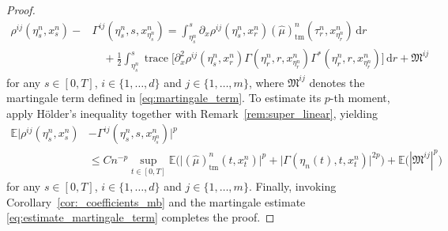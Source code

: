 \documentclass[reqno,  oneside, 12pt]{amsart}
\DeclareMathOperator{\tr}{trace}
\newcommand{\E}{\mathbb E}
\begin{document}
\begin{proof}
	\begin{align*}
		\rho^{ij}(\eta^n_s, x_s^n) - &\Gamma^{ij}(\eta^n_s, s, x_{\eta^n_s}^n)
		= \int_{\eta^n_s}^s \partial_x \rho^{ij}(\eta^n_s, x_r^n)(\widehat \mu)_{\mathrm{tm}}^{n}(\tau^n_r, x_{\eta^n_r}^n) \,  \mathrm{d}r \\
		&\quad + \frac{1}{2} \int_{\eta^n_s}^{s} \tr\Big[\partial_x^2 \rho^{ij}(\eta^n_s, x_r^n) 
		\Gamma(\eta^n_r, r, x_{\eta^n_r}^n)\Gamma^*(\eta^n_r, r, x_{\eta^n_r}^n)\Big] \,  \mathrm{d}r  + \mathfrak{M}^{ij}
	\end{align*}
	for any \( s \in [0,T] \), $i\in\{1,\ldots,d\}$ and $j\in\{1,\ldots,m\}$, where \( \mathfrak{M}^{ij} \) denotes the martingale term defined in \eqref{eq:martingale_term}. 
	To estimate its \( p \)-th moment,  apply H\"older's inequality together with Remark~\ref{rem:super_linear}, yielding
	\begin{align*}
		\E \big|\rho^{ij}(\eta^n_s, x_s^n) &-\Gamma^{ij}(\eta^n_s, s, x_{\eta^n_s}^n) \big|^p \\
		&\leq C n^{-p} \sup_{t \in [0, T]}  \E\big( 
		\big|(\widehat \mu)_{\mathrm{tm}}^{n}(t, x_t^n)\big|^p + 
		\big|\Gamma(\eta_n(t), t, x_t^n)\big|^{2p}
		\big) + \E\big(|\mathfrak{M}^{ij}|^p\big)
	\end{align*}
	for any \( s \in [0,T] \), $i\in\{1,\ldots,d\}$ and $j\in\{1,\ldots,m\}$.
	Finally, invoking Corollary~\ref{cor:_coefficients_mb} and the martingale estimate \eqref{eq:estimate_martingale_term} completes the proof.
\end{proof}
\end{document}
